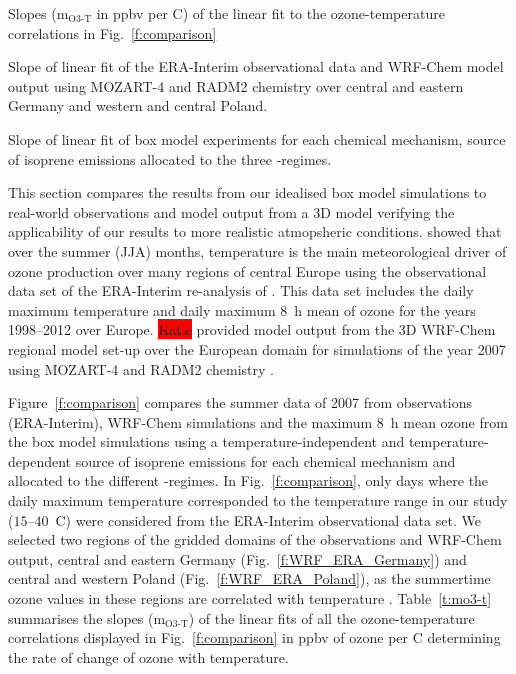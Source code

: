\begin{table}[t]%
    \centering%
    \caption{Slopes (m$_{\text{O3-T}}$ in ppbv per \degree C) of the linear fit to the ozone-temperature correlations in Fig.~\ref{f:comparison}}%
    \label{t:mo3-t}%
    \begin{subtable}[t]{\textwidth}%
        \centering%
        \vspace{2mm}%
        \caption{Slope of linear fit of the ERA-Interim observational data and WRF-Chem model output using MOZART-4 and RADM2 chemistry over central and eastern Germany and western and central Poland.}%
        \label{t:era_wrf_o3-T}%
    \end{subtable}
    \begin{subtable}[t]{\textwidth}%
        \centering%
        \vspace{2mm}
        \caption{Slope of linear fit of box model experiments for each chemical mechanism, source of isoprene emissions allocated to the three -regimes.}%
        \label{t:boxmodel_o3-T}%
    \end{subtable}
\end{table} 

This section compares the results from our idealised box model simulations to real-world observations and model output from a 3D model verifying the applicability of our results to more realistic atmopsheric conditions.
\citet{Otero:2016} showed that over the summer (JJA) months, temperature is the main meteorological driver of ozone production over many regions of central Europe using the observational data set of the ERA-Interim re-analysis of \citet{Schnell:2015}.
This data set includes the daily maximum temperature and daily maximum 8~h mean of ozone for the years 1998--2012 over Europe.
\colorbox{red}{Katie} provided model output from the 3D WRF-Chem regional model set-up over the European domain for simulations of the year 2007 using MOZART-4 and RADM2 chemistry .

Figure~\ref{f:comparison} compares the summer data of 2007 from observations (ERA-Interim), WRF-Chem simulations and the maximum 8~h mean ozone from the box model simulations using a temperature-independent and temperature-dependent source of isoprene emissions for each chemical mechanism and allocated to the different -regimes.
In Fig.~\ref{f:comparison}, only days where the daily maximum temperature corresponded to the temperature range in our study ($15$--$40$~\degree C) were considered from the ERA-Interim observational data set.
We selected two regions of the gridded domains of the observations and WRF-Chem output, central and eastern Germany (Fig.~\ref{f:WRF_ERA_Germany}) and central and western Poland (Fig.~\ref{f:WRF_ERA_Poland}), as the summertime ozone values in these regions are correlated with temperature \citep{Otero:2016}.
Table~\ref{t:mo3-t} summarises the slopes (m$_{\text{O3-T}}$) of the linear fits of all the ozone-temperature correlations displayed in Fig.~\ref{f:comparison} in ppbv of ozone per \degree C determining the rate of change of ozone with temperature.

